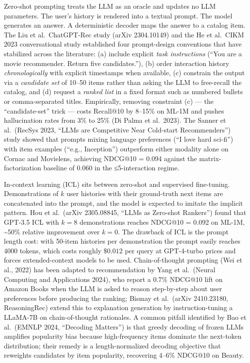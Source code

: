 \documentclass{article}
\begin{document}
Zero-shot prompting treats the LLM as an oracle and updates no LLM parameters. The user's history is rendered into a textual prompt. The model generates an answer. A deterministic decoder maps the answer to a catalog item. The Liu et al.~ChatGPT-Rec study (arXiv 2304.10149) and the He et al.~CIKM 2023 conversational study established four prompt-design conventions that have stabilized across the literature: (a) include explicit \emph{task instructions} (``You are a movie recommender. Return five candidates.''), (b) order interaction history \emph{chronologically} with explicit timestamps when available, (c) constrain the output via a \emph{candidate set} of 10--50 items rather than asking the LLM to free-recall the catalog, and (d) request a \emph{ranked list} in a fixed format such as numbered bullets or comma-separated titles. Empirically, removing constraint (c) --- the ``candidate-set'' trick --- costs Recall@10 by 8--15\% on ML-1M and pushes hallucination rates from 3\% to 25\% (Di Palma et al.~2023). The Sanner et al.~(RecSys 2023, ``LLMs are Competitive Near Cold-start Recommenders'') study showed that prompts mixing language preferences (``I love hard sci-fi'') with item examples (``e.g., Inception'') outperform either modality alone on Cornac and Movielens, achieving NDCG@10 = 0.094 against the matrix-factorization baseline of 0.060 in the ≤5-interaction regime.

In-context learning (ICL) sits between zero-shot and supervised fine-tuning. Demonstrations of \(k\) user histories with their ground-truth next items are concatenated into the prompt, and the model is expected to imitate the implicit pattern. Hou et al.~(arXiv 2305.08845, ``LLMs as Zero-shot Rankers'') found that GPT-3.5 ICL with \(k=8\) demonstrations reaches NDCG@10 = 0.092 on ML-1M, \textasciitilde50\% relative improvement over \(k=0\). The drawback of ICL is the prompt length cost: with 50-item histories per demonstration the prompt easily reaches 4000 tokens, which costs roughly \(\$0.012\) per query at GPT-4-turbo prices and forces extended-context models to be used. Chain-of-thought prompting (Wei et al., 2022) has been adapted to recommendation by Yang et al.~(Neural Computing and Applications 2024), who report a 0.7\% NDCG@10 lift on Amazon Books when the LLM is asked to reason step-by-step about user preferences before producing the ranking; Bismay et al.~(arXiv 2410.23180, ReasoningRec) extend this to explanation generation by instruction-tuning a LLaMA-7B on chain-of-thought rationales. A common pitfall identified by Bao et al.~(EMNLP 2024, ``Decoding Matters'') is that greedy decoding of frozen LLMs amplifies popularity bias because high-frequency items dominate the next-token distribution; their remedy is a length-normalized decoding objective that reweights candidates by item popularity, recovering 4--6\% NDCG@10 on Beauty.
\end{document}
